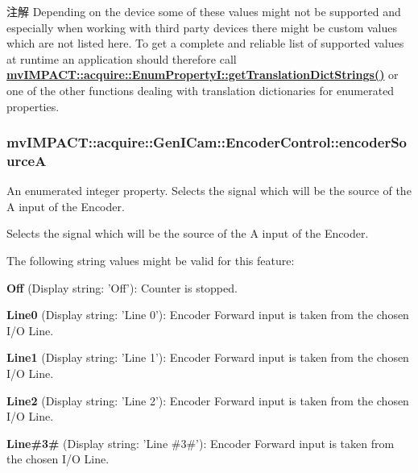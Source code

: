 \begin{DoxyNote}{注解}
Depending on the device some of these values might not be supported and especially when working with third party devices there might be custom values which are not listed here. To get a complete and reliable list of supported values at runtime an application should therefore call {\bfseries \hyperlink{classmv_i_m_p_a_c_t_1_1acquire_1_1_enum_property_i_a0ba6ccbf5ee69784d5d0b537924d26b6}{mv\+I\+M\+P\+A\+C\+T\+::acquire\+::\+Enum\+Property\+I\+::get\+Translation\+Dict\+Strings()}} or one of the other functions dealing with translation dictionaries for enumerated properties. 
\end{DoxyNote}
\hypertarget{classmv_i_m_p_a_c_t_1_1acquire_1_1_gen_i_cam_1_1_encoder_control_a10c9b2deca4c4db3e72b43747cb1a6ef}{
\subsubsection[{encoder\+Source\+A}]{ mv\+I\+M\+P\+A\+C\+T\+::acquire\+::\+Gen\+I\+Cam\+::\+Encoder\+Control\+::encoder\+Source\+A}}\label{classmv_i_m_p_a_c_t_1_1acquire_1_1_gen_i_cam_1_1_encoder_control_a10c9b2deca4c4db3e72b43747cb1a6ef}


An enumerated integer property. Selects the signal which will be the source of the A input of the Encoder. 

Selects the signal which will be the source of the A input of the Encoder.

The following string values might be valid for this feature\+:
\begin{DoxyItemize}
\item {\bfseries Off} (Display string\+: 'Off')\+: Counter is stopped.
\item {\bfseries Line0} (Display string\+: 'Line 0')\+: Encoder Forward input is taken from the chosen I/\+O Line.
\item {\bfseries Line1} (Display string\+: 'Line 1')\+: Encoder Forward input is taken from the chosen I/\+O Line.
\item {\bfseries Line2} (Display string\+: 'Line 2')\+: Encoder Forward input is taken from the chosen I/\+O Line.
\item {\bfseries Line\#3\#} (Display string\+: 'Line \#3\#')\+: Encoder Forward input is taken from the chosen I/\+O Line.
\end{DoxyItemize}

